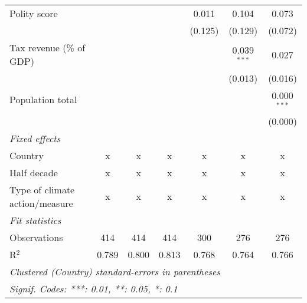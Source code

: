 \begin{tabular}{lcccccc}
   Polity score                                                    &                &                &                & 0.011          & 0.104          & 0.073\\   
                                                                   &                &                &                & (0.125)        & (0.129)        & (0.072)\\   
   Tax revenue (\% of GDP)                                         &                &                &                &                & 0.039$^{***}$  & 0.027\\   
                                                                   &                &                &                &                & (0.013)        & (0.016)\\   
   Population total                                                &                &                &                &                &                & 0.000$^{***}$\\   
                                                                   &                &                &                &                &                & (0.000)\\   
   \emph{Fixed effects}\\
   Country                                                         & x              & x              & x              & x              & x              & x\\  
   Half decade                                                     & x              & x              & x              & x              & x              & x\\  
   Type of climate action/measure                                  & x              & x              & x              & x              & x              & x\\  
   \midrule \emph{Fit statistics}\\
   Observations                                                    & 414            & 414            & 414            & 300            & 276            & 276\\  
   R$^2$                                                           & 0.789          & 0.800          & 0.813          & 0.768          & 0.764          & 0.766\\  
   \midrule
   \multicolumn{7}{l}{\emph{Clustered (Country) standard-errors in parentheses}}\\
   \multicolumn{7}{l}{\emph{Signif. Codes: ***: 0.01, **: 0.05, *: 0.1}}\\
\end{tabular}
\par\endgroup


